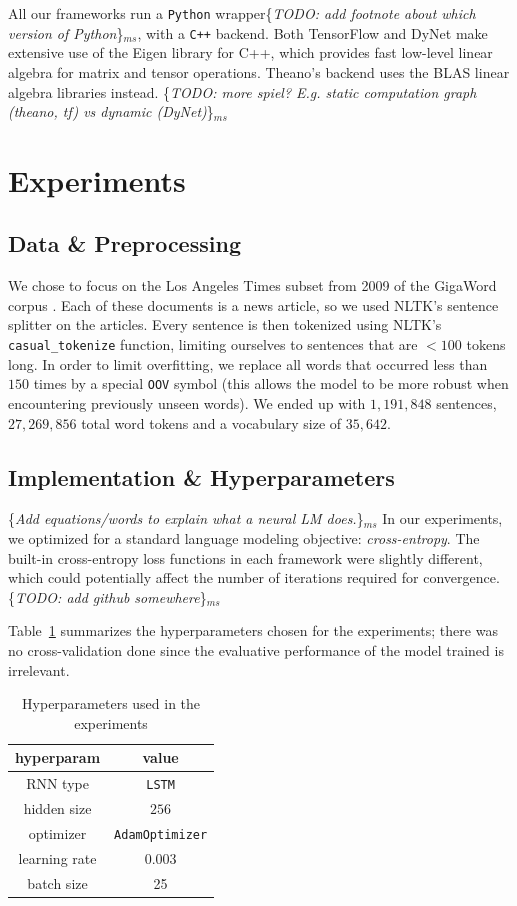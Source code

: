 \documentclass{article}
\newcommand{\ms}[1]{{\color{cyan}\{\textit{#1}\}$_{ms}$}}
\begin{document}
All our frameworks run a \texttt{Python} wrapper\ms{TODO: add footnote about which version of Python}, with a \texttt{C++} backend. Both TensorFlow and DyNet make extensive use of the Eigen library for C++, which provides fast low-level linear algebra for matrix and tensor operations. Theano's backend uses the BLAS linear algebra libraries instead.
\ms{TODO: more spiel? E.g. static computation graph (theano, tf) vs dynamic (DyNet)}

\section{Experiments}
\subsection{Data \& Preprocessing}
We chose to focus on the Los Angeles Times subset from 2009 of the GigaWord corpus \cite{gigaword}. Each of these documents is a news article, so we used NLTK’s \cite{nltk} sentence splitter on the articles. Every sentence is then tokenized using NLTK’s \verb!casual_tokenize! function, limiting ourselves to sentences that are $<100$ tokens long. In order to limit overfitting, we replace all words that occurred less than $150$ times by a special \verb!OOV! symbol (this allows the model to be more robust when encountering previously unseen words). We ended up with $1,191,848$ sentences, $27,269,856$ total word tokens and a vocabulary size of $35,642$.

\subsection{Implementation \& Hyperparameters}
\ms{Add equations/words to explain what a neural LM does.}
In our experiments, we optimized for a standard language modeling objective: \textit{cross-entropy}. The built-in cross-entropy loss functions in each framework were slightly different, which could potentially affect the number of iterations required for convergence. \ms{TODO: add github somewhere}

Table~\ref{tab:hyperparams} summarizes the hyperparameters chosen for the experiments; there was no cross-validation done since the evaluative performance of the model trained is irrelevant.
\begin{table}\begin{center}
\begin{tabular}{cc}
\textbf{hyperparam} & \textbf{value} \\\hline
RNN type & \texttt{LSTM} \\
hidden size & $256$ \\
optimizer & \texttt{AdamOptimizer} \\
learning rate & $0.003$ \\
batch size & 25 \\
\end{tabular}
\caption{\label{tab:hyperparams}Hyperparameters used in the experiments}
\end{center}\end{table}
\end{document}
